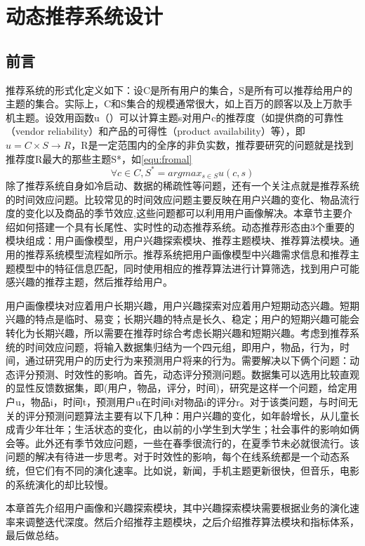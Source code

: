 
\chapter{动态推荐系统设计}
  \section{前言}
  推荐系统的形式化定义如下：设C是所有用户的集合，S是所有可以推荐给用户的主题的集合。实际上，C和S集合的规模通常很大，如上百万的顾客以及上万款手机主题。设效用函数u（）可以计算主题s对用户c的推荐度（如提供商的可靠性（vendor reliability）和产品的可得性（product availability）等），即$u=C\times S \rightarrow R$，R是一定范围内的全序的非负实数，推荐要研究的问题就是找到推荐度R最大的那些主题S*，如\autoref{equ:fromal}
    \begin{equation}
    \forall c \in C,S^{*}=arg  max_{s \in S} u(c,s)
    \label{equ:fromal}
    \end{equation}
  除了推荐系统自身如冷启动、数据的稀疏性等问题，还有一个关注点就是推荐系统的时间效应问题。比较常见的时间效应问题主要反映在用户兴趣的变化、物品流行度的变化以及商品的季节效应,这些问题都可以利用用户画像解决。本章节主要介绍如何搭建一个具有长尾性、实时性的动态推荐系统。动态推荐形态由3个重要的模块组成：用户画像模型，用户兴趣探索模块、推荐主题模块、推荐算法模块。通用的推荐系统模型流程如所示。推荐系统把用户画像模型中兴趣需求信息和推荐主题模型中的特征信息匹配，同时使用相应的推荐算法进行计算筛选，找到用户可能感兴趣的推荐主题，然后推荐给用户。

  用户画像模块对应着用户长期兴趣，用户兴趣探索对应着用户短期动态兴趣。短期兴趣的特点是临时、易变；长期兴趣的特点是长久、稳定；用户的短期兴趣可能会转化为长期兴趣，所以需要在推荐时综合考虑长期兴趣和短期兴趣。考虑到推荐系统的时间效应问题，将输入数据集归结为一个四元组，即{用户，物品，行为，时间}，通过研究用户的历史行为来预测用户将来的行为。需要解决以下俩个问题：动态评分预测、时效性的影响。首先，动态评分预测问题。数据集可以选用比较直观的显性反馈数据集，即(用户，物品，评分，时间)，研究是这样一个问题，给定用户u，物品i，时间t，预测用户u在时间t对物品i的评分r。对于该类问题，与时间无关的评分预测问题算法主要有以下几种：用户兴趣的变化，如年龄增长，从儿童长成青少年壮年；生活状态的变化，由以前的小学生到大学生；社会事件的影响如俩会等。此外还有季节效应问题，一些在春季很流行的，在夏季节未必就很流行。该问题的解决有待进一步思考。对于时效性的影响，每个在线系统都是一个动态系统，但它们有不同的演化速率。比如说，新闻，手机主题更新很快，但音乐，电影的系统演化的却比较慢。

  本章首先介绍用户画像和兴趣探索模块，其中兴趣探索模块需要根据业务的演化速率来调整迭代深度。然后介绍推荐主题模块，之后介绍推荐算法模块和指标体系，最后做总结。
  
